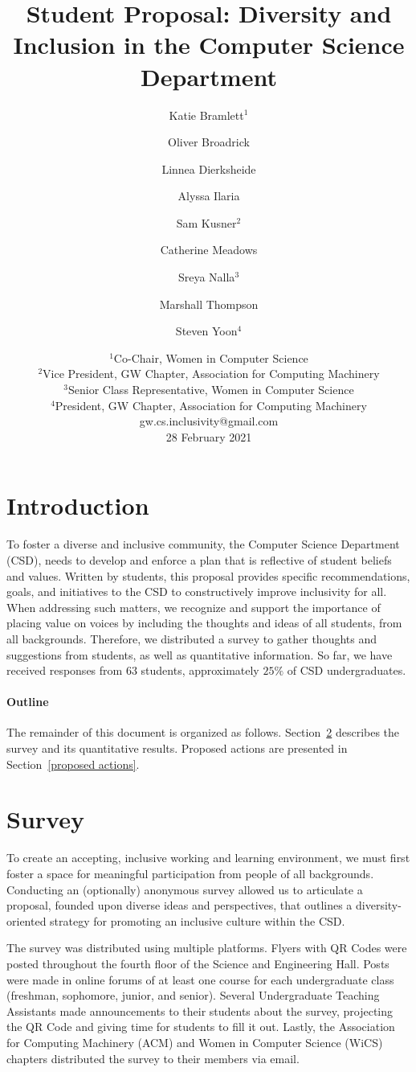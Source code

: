 \documentclass{article}
\title{Student Proposal: Diversity and Inclusion in the Computer Science Department}
\author{
Katie Bramlett$^1$\and
Oliver Broadrick\and
Linnea Dierksheide\and
Alyssa Ilaria\and
Sam Kusner$^2$\and
Catherine Meadows\and
Sreya Nalla$^3$\and
Marshall Thompson\and
Steven Yoon$^4$
}
\date{%
    $^1$Co-Chair, Women in Computer Science\\
    $^2$Vice President, GW Chapter, Association for Computing Machinery\\
    $^3$Senior Class Representative, Women in Computer Science\\
    $^4$President, GW Chapter, Association for Computing Machinery\\
    gw.cs.inclusivity@gmail.com\\
    28 February 2021
}
\begin{document}
\maketitle


\section{Introduction}
To foster a diverse and inclusive community, the Computer Science Department (CSD), 
needs to develop and enforce a plan that is reflective of student beliefs and values.
Written by students, this proposal
provides specific recommendations, goals, and initiatives
to the CSD to constructively improve
inclusivity for all.
When addressing such matters, we recognize and support the importance of 
placing value on voices by including the thoughts and ideas of all students, from all backgrounds.
Therefore, we distributed a survey to gather thoughts and suggestions from students, as well as 
quantitative information. So far, we have
received responses from $63$ students, approximately $25\%$ of CSD undergraduates.

\paragraph{Outline}
The remainder of this document is organized as follows.
Section~\ref{survey} describes the survey and its quantitative results.
Proposed actions are presented in Section~\ref{proposed actions}.

\section{Survey}\label{survey}
To create an accepting, inclusive working and learning environment, we must 
first foster a space for meaningful participation from people of all backgrounds.
Conducting an (optionally) anonymous survey allowed us to articulate a proposal, 
founded upon diverse ideas and perspectives, that outlines a diversity-oriented
strategy for promoting an inclusive culture within the CSD.

The survey was distributed using multiple platforms. Flyers with QR Codes were posted
throughout the fourth floor of the Science and Engineering Hall.
Posts were made in online forums of at least one course
for each undergraduate class (freshman, sophomore, junior, and senior).
Several Undergraduate Teaching Assistants made announcements to their 
students about the survey, projecting the QR Code and giving time
for students to fill it out. Lastly, the Association for Computing Machinery (ACM) and Women 
in Computer Science (WiCS) chapters distributed the survey to their members via email. 
\end{document}
